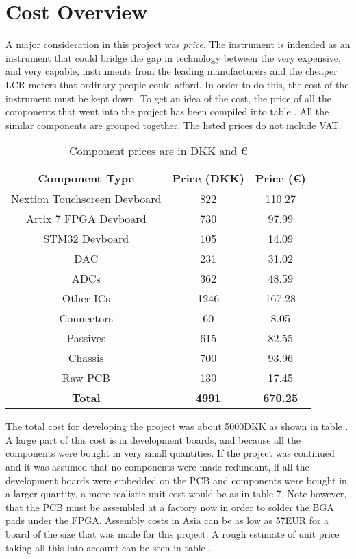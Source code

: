 \chapter{Cost Overview} \label{App:A_CostOverview}
A major consideration in this project was \textit{price}. The instrument is indended as an instrument that could bridge the gap in technology between the very expensive, and very capable, instruments from the leading manufacturers and the cheaper LCR meters that ordinary people could afford. In order to do this, the cost of the instrument must be kept down. To get an idea of the cost, the price of all the components that went into the project has been compiled into table . All the similar components are grouped together. The listed prices do not include VAT.

\begin{table}[H]
    \centering
    \renewcommand{\arraystretch}{1.5}
    \setlength{\tabcolsep}{8pt}
    \begin{tabular}{|c|c|c|}
    \hline
    \textbf{Component Type} & \textbf{Price (DKK)} & \textbf{Price (€)} \\ \hline
    Nextion Touchscreen Devboard & 822 & 110.27 \\ \hline
    Artix 7 FPGA Devboard & 730 & 97.99 \\ \hline
    STM32 Devboard & 105 & 14.09 \\ \hline
    DAC & 231 & 31.02 \\ \hline
    ADCs & 362 & 48.59 \\ \hline
    Other ICs & 1246 & 167.28 \\ \hline
    Connectors & 60 & 8.05 \\ \hline
    Passives & 615 & 82.55 \\ \hline
    Chassis & 700 & 93.96 \\ \hline
    Raw PCB & 130 & 17.45 \\ \hline
    \textbf{Total} & \textbf{4991} & \textbf{670.25} \\ \hline
    \end{tabular}
    \caption{Component prices are in DKK and €}
    \label{tab:ComponentTypeAndPrice}
\end{table}

The total cost for developing the project was about 5000DKK as shown in table . A large part of this cost is in development boards, and because all the components were bought in very small quantities. If the project was continued and it was assumed that no components were made redundant, if all the development boards were embedded on the PCB and components were bought in a larger quantity, a more realistic unit cost would be as in table 7. Note however, that the PCB must be assembled at a factory now in order to solder the BGA pads under the FPGA. Assembly costs in Asia can be as low as 57EUR for a board of the size that was made for this project. A rough estimate of unit price taking all this into account can be seen in table .

